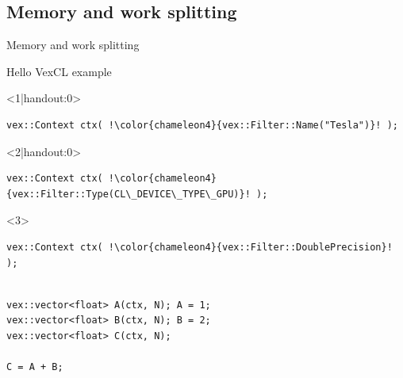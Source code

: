 \documentclass[@BEAMER_OPTIONS@]{beamer}
\begin{document}
\subsection{Memory and work splitting}

\begin{frame}[fragile]{Memory and work splitting}
    \begin{exampleblock}{Hello VexCL example}
        \begin{onlyenv}<1|handout:0>
        \begin{lstlisting}[escapechar=!]
vex::Context ctx( !\color{chameleon4}{vex::Filter::Name("Tesla")}! );
        \end{lstlisting}
        \end{onlyenv}
        \begin{onlyenv}<2|handout:0>
        \begin{lstlisting}[escapechar=!]
vex::Context ctx( !\color{chameleon4}{vex::Filter::Type(CL\_DEVICE\_TYPE\_GPU)}! );
        \end{lstlisting}
        \end{onlyenv}
        \begin{onlyenv}<3>
        \begin{lstlisting}[escapechar=!]
vex::Context ctx( !\color{chameleon4}{vex::Filter::DoublePrecision}! );
        \end{lstlisting}
        \end{onlyenv}
        \begin{lstlisting}[firstnumber=last]

vex::vector<float> A(ctx, N); A = 1;
vex::vector<float> B(ctx, N); B = 2;
vex::vector<float> C(ctx, N);

C = A + B;
        \end{lstlisting}
    \end{exampleblock}
    \begin{figure}
\end{figure}
\end{frame}
\end{document}

